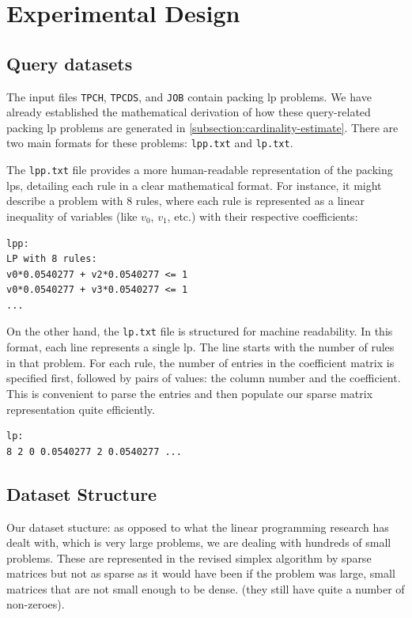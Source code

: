 \section{Experimental Design}
\subsection{Query datasets}
The input files \texttt{TPCH}, \texttt{TPCDS}, and \texttt{JOB} contain packing
\gls{lp} problems. We have already established the mathematical derivation of how
these query-related packing
\gls{lp} problems are generated in \ref{subsection:cardinality-estimate}.
There are two main formats for these problems:
\texttt{lpp.txt} and \texttt{lp.txt}.

The \texttt{lpp.txt} file provides a more human-readable representation of the
packing \glspl{lp}, detailing each rule in a clear mathematical format.
For instance, it might describe a problem with 8 rules,
where each rule is represented as a linear inequality of variables
(like \(v_0\), \(v_1\), etc.) with their respective coefficients:

\begin{lstlisting}
lpp:
LP with 8 rules:
v0*0.0540277 + v2*0.0540277 <= 1
v0*0.0540277 + v3*0.0540277 <= 1
...
\end{lstlisting}

On the other hand, the \texttt{lp.txt} file is structured for machine readability.
In this format, each line represents a single \gls{lp}. The line starts with
the number of rules in that problem. For each rule, the number of entries in
the coefficient matrix is specified first, followed by pairs of values:
the column number and the coefficient. This is convenient to parse the entries
and then populate our sparse matrix representation quite efficiently.

\begin{lstlisting}
lp:
8 2 0 0.0540277 2 0.0540277 ...
\end{lstlisting}

\subsection{Dataset Structure}
Our dataset stucture:
as opposed to what the linear programming research has dealt with, which is
very large problems, we are dealing with hundreds of small problems. These are represented
in the revised simplex algorithm by
sparse matrices but not as sparse as it would have been if the problem was large,
small matrices that are not small enough to be dense.
(they still have quite a number of non-zeroes).

